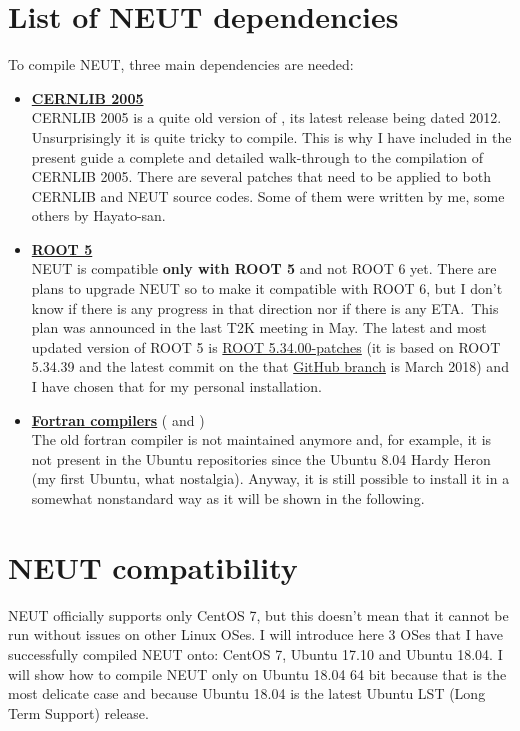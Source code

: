 \section{List of NEUT dependencies}\label{dep}
To compile NEUT, three main dependencies are needed:
\begin{itemize}
\item \hyperref[]{\textbf{CERNLIB 2005}}\\
  CERNLIB 2005 is a quite old version of , its
  latest release being dated 2012. Unsurprisingly it is quite tricky
  to compile. This is why I have included in the present guide a
  complete and detailed walk-through to the compilation of CERNLIB
  2005. There are several patches that need to be applied to both
  CERNLIB and NEUT source codes. Some of them were written by me, some
  others by Hayato-san.
\item \hyperref[root5]{\textbf{ROOT 5}}\\
  NEUT is compatible \textbf{only with ROOT 5} and not ROOT 6
  yet. There are plans to upgrade NEUT so to make it compatible with
  ROOT 6, but I don't know if there is any progress in that direction
  nor if there is any ETA.\ This plan was announced in the last T2K
  meeting in May. The latest and most updated version of ROOT 5 is
  \href{https://github.com/root-project/root/tree/v5-34-00-patches?files=1}{ROOT
    5.34.00-patches} (it is based on ROOT 5.34.39 and the latest
  commit on the that
  \href{https://github.com/root-project/root/tree/v5-34-00-patches?files=1}{GitHub
    branch} is March 2018) and I have chosen that for my personal
  installation.
\item \hyperref[]{\textbf{Fortran compilers}} (
  and
  )\\
  The old fortran compiler  is not maintained anymore
  and, for example, it is not present in the Ubuntu repositories since
  the Ubuntu 8.04 Hardy Heron (my first Ubuntu, what
  nostalgia). Anyway, it is still possible to install it in a somewhat
  nonstandard way as it will be shown in the following.
\end{itemize}

\section{NEUT compatibility}
NEUT officially supports only CentOS 7, but this doesn't mean that it
cannot be run without issues on other Linux OSes. I will introduce
here 3 OSes that I have successfully compiled NEUT onto: CentOS 7,
Ubuntu 17.10 and Ubuntu 18.04. I will show how to compile NEUT only on
Ubuntu 18.04 64 bit because that is the most delicate case and because
Ubuntu 18.04 is the latest Ubuntu LST (Long Term Support) release.
